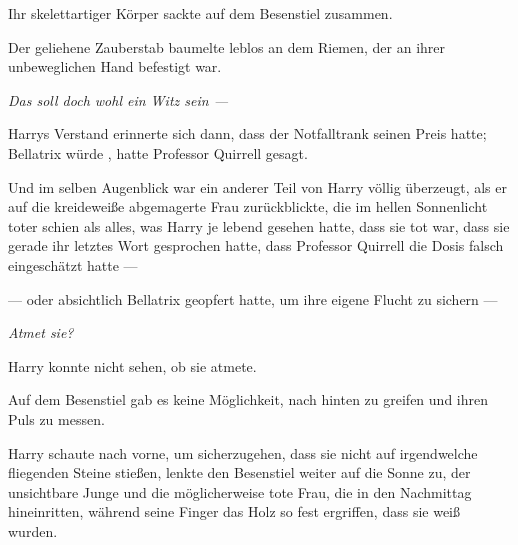 Ihr skelettartiger Körper sackte auf dem Besenstiel zusammen.

Der geliehene Zauberstab baumelte leblos an dem Riemen, der an ihrer unbeweglichen Hand befestigt war.

\emph{Das soll doch wohl ein Witz sein —}

Harrys Verstand erinnerte sich dann, dass der Notfalltrank seinen Preis hatte; Bellatrix würde , hatte Professor Quirrell gesagt.

Und im selben Augenblick war ein anderer Teil von Harry völlig überzeugt, als er auf die kreideweiße abgemagerte Frau zurückblickte, die im hellen Sonnenlicht toter schien als alles, was Harry je lebend gesehen hatte, dass sie tot war, dass sie gerade ihr letztes Wort gesprochen hatte, dass Professor Quirrell die Dosis falsch eingeschätzt hatte —

— oder absichtlich Bellatrix geopfert hatte, um ihre eigene Flucht zu sichern —

\emph{Atmet sie?}

Harry konnte nicht sehen, ob sie atmete.

Auf dem Besenstiel gab es keine Möglichkeit, nach hinten zu greifen und ihren Puls zu messen.

Harry schaute nach vorne, um sicherzugehen, dass sie nicht auf irgendwelche fliegenden Steine stießen, lenkte den Besenstiel weiter auf die Sonne zu, der unsichtbare Junge und die möglicherweise tote Frau, die in den Nachmittag hineinritten, während seine Finger das Holz so fest ergriffen, dass sie weiß wurden.

